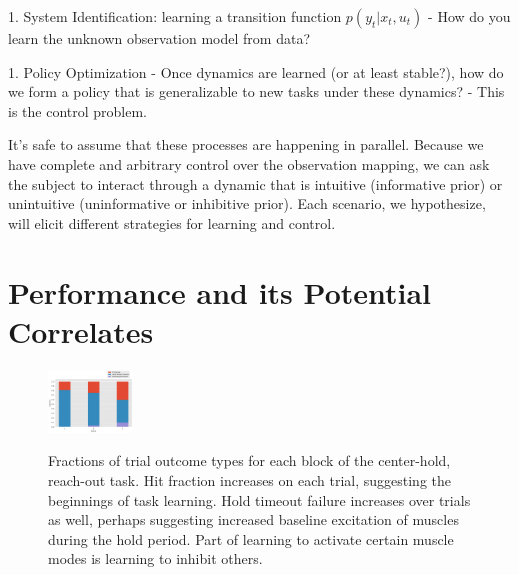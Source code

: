 \documentclass[../main.tex]{subfiles}
\begin{document}
 
 1. System Identification: learning a transition function $p(y_t|x_t, u_t)$
    - How do you learn the unknown observation model from data?

1. Policy Optimization
    - Once dynamics are learned (or at least stable?), how do we form a policy that is generalizable to new tasks under these dynamics?
    - This is the control problem.

It's safe to assume that these processes are happening in parallel. Because we have complete and arbitrary control over the observation mapping, we can ask the subject to interact through a  dynamic that is intuitive (informative prior) or unintuitive (uninformative or inhibitive prior). Each scenario, we hypothesize, will elicit different strategies for learning and control.






\section{Performance and its Potential Correlates}




\begin{figure}
    \label{fig:hit_fraction}
    \centering
    \includegraphics[width=0.2\textwidth]{images/data_analysis/center_hold/hit_fraction.pdf}
    \caption{Fractions of trial outcome types for each block of the center-hold, reach-out task. Hit fraction increases on each trial, suggesting the beginnings of task learning. Hold timeout failure increases over trials as well, perhaps suggesting increased baseline excitation of muscles during the hold period. Part of learning to activate certain muscle modes is learning to inhibit others.}\label{fig:hit_fraction}
    \end{figure}
    
\end{document}
